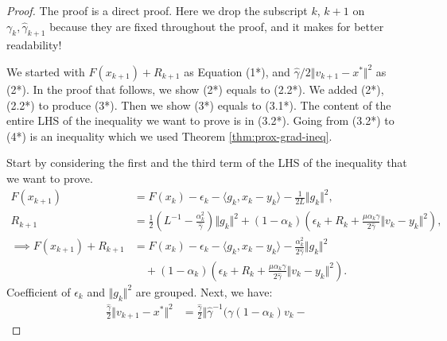 \documentclass[12pt]{article}
\begin{document}
    \begin{proof}
        The proof is a direct proof. 
        Here we drop the subscript $k$, $k + 1$ on $\gamma_{k}, \hat \gamma_{k + 1}$ because they are fixed throughout the proof, and it makes for better readability! 
        \par 
        We started with $F(x_{k + 1}) + R_{k + 1}$ as Equation (1*), and $\hat \gamma/2\Vert v_{k + 1} - x^*\Vert^2$ as (2*). 
        In the proof that follows, we show (2*) equals to (2.2*). 
        We added (2*), (2.2*) to produce (3*). 
        Then we show (3*) equals to (3.1*). 
        The content of the entire LHS of the inequality we want to prove is in (3.2*). 
        Going from (3.2*) to (4*) is an inequality which we used Theorem \ref{thm:prox-grad-ineq}. 
        \par
        Start by considering the first and the third term of the LHS of the inequality that we want to prove. 
        \begin{align*}
            F(x_{k + 1}) &= 
            F(x_k) - \epsilon_k - \langle  g_k, x_k - y_k\rangle - \frac{1}{2L}\Vert g_k\Vert^2, 
            \\
            R_{k + 1}
            &= 
            \frac{1}{2}\left(
                L^{-1} - \frac{\alpha_k^2}{\hat \gamma}
            \right)\Vert g_k\Vert^2
            + 
            (1 - \alpha_k)
            \left(
                \epsilon_k + R_k + 
                \frac{\mu\alpha_k\gamma}{2\hat \gamma}
                \Vert v_k - y_k\Vert^2
            \right), 
            \\
            \implies 
            F(x_{k + 1}) + R_{k + 1}
            &= 
            F(x_k) - \epsilon_k - \langle  g_k, x_k - y_k\rangle
            - \frac{\alpha_k^2}{2\hat \gamma}\Vert g_k\Vert^2
            \\
            &\quad 
                + 
                (1 - \alpha_k)
                \left(
                    \epsilon_k + R_k + 
                    \frac{\mu\alpha_k\gamma}{2\hat \gamma}
                    \Vert v_k - y_k\Vert^2
                \right). 
        \tag{1*}
        \end{align*}
        Coefficient of $\epsilon_k$ and $\Vert g_k\Vert^2$ are grouped. 
        Next, we have: 
        \begin{align*}
            \frac{\hat \gamma}{2}\Vert v_{k + 1} - x^* \Vert^2
            &= 
            \frac{\hat \gamma}{2}\Vert 
                \hat \gamma^{-1}
                (
                    \gamma(1 - \alpha_k)v_k - 

\end{align*}
\end{proof}
\end{document}
